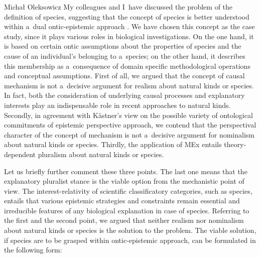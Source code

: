 \begin{artengenv}{Michał Oleksowicz}
My colleagues and I~have discussed the problem of the definition of species, suggesting that the concept of species is better understood within a~dual ontic-epistemic approach
\parencite[][]{marcacci_ontic_2023}. %
 We have chosen this concept as the case study, since it plays various roles in biological investigations. On the one hand, it is based on certain ontic assumptions about the properties of species and the cause of an individual's belonging to a~species; on the other hand, it describes this membership as a~consequence of domain specific methodological operations and conceptual assumptions. First of all, we argued that the concept of causal mechanism is not a~decisive argument for realism about natural kinds or species. In fact, both the consideration of underlying causal processes and explanatory interests play an indispensable role in recent approaches to natural kinds. Secondly, in agreement with Kästner's view on the possible variety of ontological commitments of epistemic perspective approach, we contend that the perspectival character of the concept of mechanism is not a~decisive argument for nominalism about natural kinds or species. Thirdly, the application of MEx entails theory-dependent pluralism about natural kinds or species.

Let us briefly further comment these three points. The last one means that the explanatory pluralist stance is the viable option from the mechanistic point of view. The interest-relativity of scientific classificatory categories, such as species, entails that various epistemic strategies and constraints remain essential and irreducible features of any biological explanation in case of species. Referring to the first and the second point, we argued that neither realism nor nominalism about natural kinds or species is the solution to the problem. The viable solution, if species are to be grasped within ontic-epistemic approach, can be formulated in the following form:


\end{artengenv}
